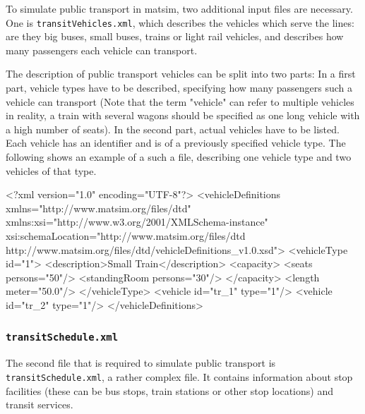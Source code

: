 
 

To simulate public transport in \gls{matsim}, two additional input files are necessary. One is \lstinline|transitVehicles.xml|, which describes the vehicles which serve the lines: are they big buses, small buses, trains or light rail vehicles, and describes how many passengers each vehicle can transport.

The description of public transport vehicles can be split into two parts: In a first part, vehicle types have to be described, specifying how many passengers such a vehicle can transport (Note that the term "vehicle" can refer to multiple vehicles in reality, \eg a train with several wagons should be specified as one long vehicle with a high number of seats). In the second part, actual vehicles have to be listed. Each vehicle has an identifier and is of a previously specified vehicle type. The following shows an example of a such a file, describing one vehicle type and two vehicles of that type. 

\begin{xml}
<?xml version="1.0" encoding="UTF-8"?> 
<vehicleDefinitions xmlns="http://www.matsim.org/files/dtd" 
       xmlns:xsi="http://www.w3.org/2001/XMLSchema-instance" 
       xsi:schemaLocation="http://www.matsim.org/files/dtd http://www.matsim.org/files/dtd/vehicleDefinitions_v1.0.xsd"> 
	<vehicleType id="1"> 
      <description>Small Train</description> 
      <capacity> 
         <seats persons="50"/> 
         <standingRoom persons="30"/> 
      </capacity> 
      <length meter="50.0"/> 
   </vehicleType> 
   <vehicle id="tr_1" type="1"/> 
   <vehicle id="tr_2" type="1"/> 
</vehicleDefinitions>
\end{xml}

\subsubsection{\lstinline|transitSchedule.xml|}
\label{sec:inputdata:transitschedule}
The second file that is required to simulate public transport is \lstinline|transitSchedule.xml|, a rather complex file. It contains information about stop facilities (these can be bus stops, train stations or other stop locations) and transit services.

